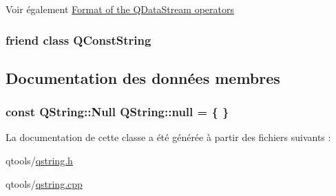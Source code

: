 \begin{DoxySeeAlso}{Voir également}
\hyperlink{}{Format of the Q\+Data\+Stream operators } 
\end{DoxySeeAlso}
\hypertarget{class_q_string_aff7e2646af69210685c894cbc1646332}{}
\subsubsection[{Q\+Const\+String}]{\setlength{\rightskip}{0pt plus 5cm}friend class {\bf Q\+Const\+String}\hspace{0.3cm}{\ttfamily [friend]}}\label{class_q_string_aff7e2646af69210685c894cbc1646332}


\subsection{Documentation des données membres}
\hypertarget{class_q_string_ad5c6b3d92cd7034d555365fd39bfdf4b}{}
\subsubsection[{null}]{\setlength{\rightskip}{0pt plus 5cm}const {\bf Q\+String\+::\+Null} Q\+String\+::null = \{ \}\hspace{0.3cm}{\ttfamily [static]}}\label{class_q_string_ad5c6b3d92cd7034d555365fd39bfdf4b}


La documentation de cette classe a été générée à partir des fichiers suivants \+:\begin{DoxyCompactItemize}
\item 
qtools/\hyperlink{qstring_8h}{qstring.\+h}\item 
qtools/\hyperlink{qstring_8cpp}{qstring.\+cpp}\end{DoxyCompactItemize}
